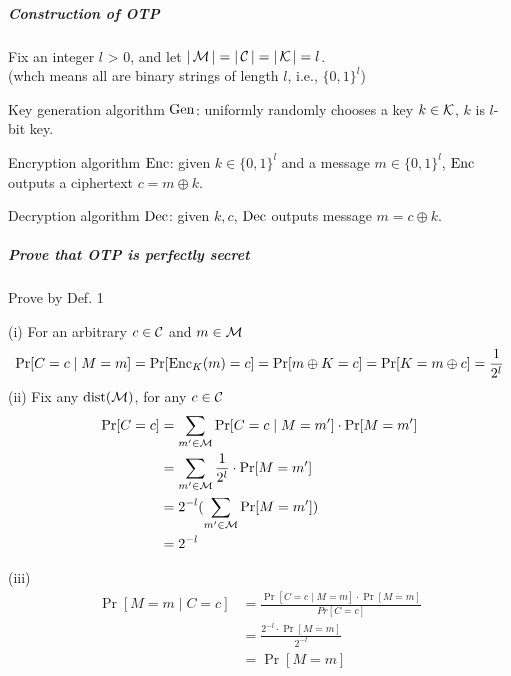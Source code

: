 \subparagraph{Construction of OTP}

Fix an integer \(l\) > 0, and let \(|\operatorname{\mathcal{M}}| = |\operatorname{\mathcal{C}}| = |\operatorname{\mathcal{K}}| = l\). \\
(whch means all are binary strings of length \(l\), i.e., \(\{0, 1\}^l\))

Key generation algorithm \(\operatorname{Gen}\): uniformly randomly chooses a key \(k \in \operatorname{\mathcal{K}}\), \(k\) is \(l\)-bit key.

Encryption algorithm \(\operatorname{Enc}\): given \(k \in \{0, 1\}^l\) and a message \(m \in \{0, 1\}^l\), \(\operatorname{Enc}\) outputs a ciphertext \(c = m \oplus k\).

Decryption algorithm \(\operatorname{Dec}\): given \(k, c\), \(\operatorname{Dec}\) outputs message \(m = c \oplus k\).

\subparagraph{Prove that OTP is perfectly secret}

Prove by Def. 1

(i) For an arbitrary \(c \in \operatorname{\mathcal{C}}\) and \(m \in \operatorname{\mathcal{M}}\) \\
\[ \Pr[C = c \mid M = m] = \Pr[\operatorname{Enc}_K(m) = c] = \Pr[m \oplus K = c] = \Pr[K = m \oplus c] = \frac{1}{2^l}\]
(ii) Fix any \(\operatorname{dist}(\operatorname{\mathcal{M}})\), for any \(c \in \operatorname{\mathcal{C}}\)
\begin{align*}
	\Pr [C = c] &= \sum_{m' \in \operatorname{\mathcal{M}}} \Pr[C = c \mid M = m'] \cdot \Pr[M = m'] \\
	&= \sum_{m' \in \operatorname{\mathcal{M}}} \frac{1}{2^l} \cdot \Pr[M = m'] \\
	&= 2^{-l} (\sum_{m' \in \operatorname{\mathcal{M}}} \Pr[M = m']) \\
	&= 2^{-l}
\end{align*}

(iii)
\begin{align*}
	\Pr[M = m \mid C = c] &= \frac{\Pr[C = c \mid M = m] \cdot \Pr[M = m]}{Pr[C = c]} \\
	&= \frac{2^{-l} \cdot \Pr[M = m]}{2^{-l}} \\
	&= \Pr[M = m]
\end{align*}

